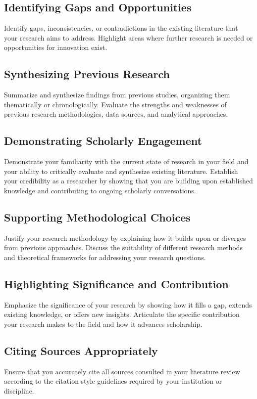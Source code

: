 \subsection{Identifying Gaps and Opportunities}
Identify gaps, inconsistencies, or contradictions in the existing literature that your research aims to address.
Highlight areas where further research is needed or opportunities for innovation exist.

\subsection{Synthesizing Previous Research}
Summarize and synthesize findings from previous studies, organizing them thematically or chronologically.
Evaluate the strengths and weaknesses of previous research methodologies, data sources, and analytical approaches.
    
\subsection{Demonstrating Scholarly Engagement}
Demonstrate your familiarity with the current state of research in your field and your ability to critically evaluate and synthesize existing literature.
Establish your credibility as a researcher by showing that you are building upon established knowledge and contributing to ongoing scholarly conversations.
    
\subsection{Supporting Methodological Choices}
Justify your research methodology by explaining how it builds upon or diverges from previous approaches.
Discuss the suitability of different research methods and theoretical frameworks for addressing your research questions.
    
\subsection{Highlighting Significance and Contribution}
Emphasize the significance of your research by showing how it fills a gap, extends existing knowledge, or offers new insights.
Articulate the specific contribution your research makes to the field and how it advances scholarship.
    
\subsection{Citing Sources Appropriately}
Ensure that you accurately cite all sources consulted in your literature review according to the citation style guidelines required by your institution or discipline.

